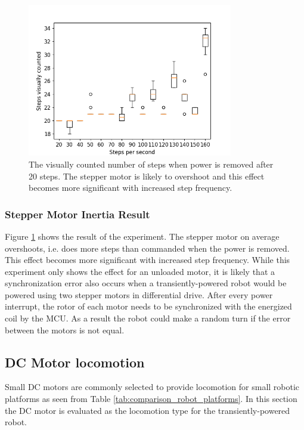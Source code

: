\begin{figure}
	\centering
	\includegraphics[width=0.8\textwidth]{pics/figure_intertia.png}
	\caption{The visually counted number of steps when power is removed after 20 steps. The stepper motor is likely to overshoot and this effect becomes more significant with increased step frequency.}
	\label{fig:step_results}
\end{figure}




\subsubsection{Stepper Motor Inertia Result}

Figure \ref{fig:step_results} shows the result of the experiment.
The stepper motor on average overshoots, i.e. does more steps than commanded when the power is removed.
This effect becomes more significant with increased step frequency.
While this experiment only shows the effect for an unloaded motor, it is likely that a synchronization error also occurs when a transiently-powered robot would be powered using two stepper motors in differential drive.
After every power interrupt, the rotor of each motor needs to be synchronized with the energized coil by the MCU.
As a result the robot could make a random turn if the error between the motors is not equal.

\subsection{DC Motor locomotion}
\label{sec:pre_dc_motor_locomotion}
Small DC motors are commonly selected to provide locomotion for small robotic platforms as seen from Table \ref{tab:comparison_robot_platforms}.
In this section the DC motor is evaluated as the locomotion type for the transiently-powered robot.

